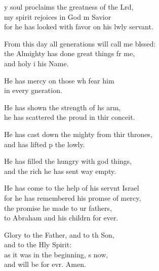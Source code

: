 \settowidth{\versewidth}{From this day all generations will call me blessed: +}
\begin{psalmverse}%
  \begin{patverse}
y soul proclaims the greatness of the Lrd,\Flex\\
my spirit rejoices in God m Savior\Med\\
for he has looked with favor on his lwly servant.

From this day all generations will call me blssed:\Flex\\
the Almighty has done great things fr me,\Med\\
and holy i his Name.

He has mercy on those wh fear him\Med\\
in every gneration.

He has shown the strength of h\pointup{\i}s arm,\Med\\
he has scattered the proud in thir conceit.

He has cast down the mighty from thir thrones,\Med\\
and has lifted p the lowly.

He has filled the hungry with god things,\Med\\
and the rich he has sent way empty.

He has come to the help of his servnt Israel\Med\\
for he has remembered his promse of mercy,\\
the promise he made to ur fathers,\Med\\
to Abraham and his childrn for ever.

Glory to the Father, and to th Son,\Med\\
and to the Hly Spirit:\\
as it was in the beginning, \pointup{\i}s now,\Med\\
and will be for evr. Amen.
  \end{patverse}
\end{psalmverse}
